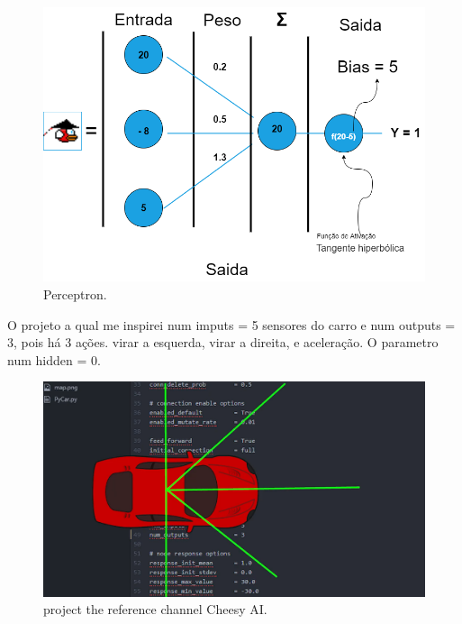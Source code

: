 \begin{figure}[htpb!]
    \centering 
    \includegraphics[width=0.7\linewidth]{images/passaroRNA3.png}
    \caption{Perceptron.}
    \label{fig:gym}
\end{figure}
O projeto a qual me inspirei  num imputs = 5 sensores do carro e
num outputs  = 3, pois há 3 ações. virar a esquerda, virar a direita, e aceleração.
O parametro num hidden = 0.
\begin{figure}[htpb!]
    \centering 
    \includegraphics[width=0.7\linewidth]{images/car.png}
    \caption{project the reference channel Cheesy AI.}
    \label{fig:gym}
\end{figure}
\cite{Cheesy}

